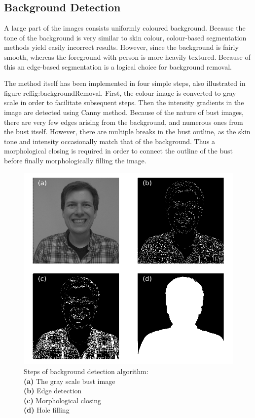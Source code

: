 \documentclass[journal]{IEEEtran}
\begin{document}
\subsection{Background Detection}
A large part of the images consists uniformly coloured background.
Because the tone of the background is very similar to skin colour, colour-based segmentation methods yield easily incorrect results. 
However, since the background is fairly smooth, whereas the foreground with person is more heavily textured. 
Because of this an edge-based segmentation is a logical choice for background removal.

The method itself has been implemented in four simple steps, also illustrated in figure ref{fig:backgroundRemoval}.
First, the colour image is converted to gray scale in order to facilitate subsequent steps.
Then the intensity gradients in the image are detected using Canny method.
Because of the nature of bust images, there are very few edges arising from the background, and numerous ones from the bust itself.
However, there are multiple breaks in the bust outline, as the skin tone and intensity occasionally match that of the background. 
Thus a morphological closing is required in order to connect the outline of the bust before finally morphologically filling the image.


\begin{figure}
    \centering
    \includegraphics[width=\linewidth]{BGRemoval.png}
    \caption{Steps of background detection algorithm:\\
        \textbf{(a)} The gray scale bust image\\
        \textbf{(b)} Edge detection\\
        \textbf{(c)} Morphological closing\\
        \textbf{(d)} Hole filling
    }
    \label{fig:backgroundRemoval}
\end{figure}
\end{document}
